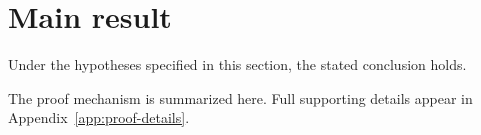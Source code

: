 \section{Main result}

\begin{theorem}\label{thm:main}
Under the hypotheses specified in this section, the stated conclusion holds.
\end{theorem}

The proof mechanism is summarized here. Full supporting details appear in
Appendix~\ref{app:proof-details}.
